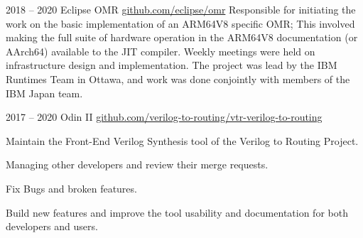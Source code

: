 

\vspace*{6pt}

\entrys
{2018 -- 2020}
{Eclipse OMR}
{\href{https://github.com/eclipse/omr}{github.com/eclipse/omr}}{
	Responsible for initiating the work on the basic implementation of an ARM64V8 specific OMR; This involved making the full suite of hardware operation in the ARM64V8 documentation (or AArch64) available to the JIT compiler.
	Weekly meetings were held on infrastructure design and implementation.
	The project was lead by the IBM Runtimes Team in Ottawa, and work was done conjointly with members of the IBM Japan team.
}

\entrys
{2017 -- 2020}
{Odin II}
{\href{https://github.com/verilog-to-routing/vtr-verilog-to-routing/graphs/contributors}{github.com/verilog-to-routing/vtr-verilog-to-routing}}{
	Maintain the Front-End Verilog Synthesis tool of the Verilog to Routing Project.
	\begin{tightemize}
		\item Managing other developers and review their merge requests.
		\item Fix Bugs and broken features.
		\item Build new features and improve the tool usability and documentation for both developers and users.
	\end{tightemize}
}
